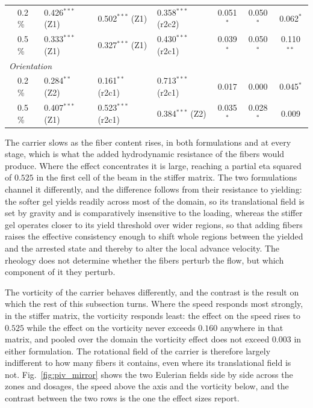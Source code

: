 \documentclass[%
  aip,
  pof,          %
  reprint,      %
  floatfix
]{revtex4-2}
\begin{document}
\begin{table}[htb]
\begin{tabular}{l l l l l c c c}
  & 0.2\,\% & 0.426$^{***}$ (Z1)  & 0.502$^{***}$ (Z1)  & 0.358$^{***}$ (r2c2) & 0.051$^{*}$ & 0.050$^{*}$ & 0.062$^{*}$ \\
  & 0.5\,\% & 0.333$^{***}$ (Z1)  & 0.327$^{***}$ (Z1)  & 0.430$^{***}$ (r2c1) & 0.039$^{*}$ & 0.050$^{*}$ & 0.110$^{**}$ \\
\midrule
\multicolumn{8}{l}{\textit{Orientation}} \\
\addlinespace[1pt]
\multirow{2}{*}{$\eta_{1}$ \; fiber}
  & 0.2\,\% & 0.284$^{**}$ (Z2)   & 0.161$^{**}$ (r2c1) & 0.713$^{***}$ (r2c1) & 0.017 & 0.000 & 0.045$^{*}$ \\
  & 0.5\,\% & 0.407$^{***}$ (Z1)  & 0.523$^{***}$ (r2c1) & 0.384$^{***}$ (Z2)  & 0.035$^{*}$ & 0.028$^{*}$ & 0.009 \\
\bottomrule
\end{tabular}
\end{table}

The carrier slows as the fiber content rises, in both formulations and at every stage, which is what the added hydrodynamic resistance of the fibers would produce. Where the effect concentrates it is large, reaching a partial eta squared of $0.525$ in the first cell of the beam in the stiffer matrix. The two formulations channel it differently, and the difference follows from their resistance to yielding: the softer gel yields readily across most of the domain, so its translational field is set by gravity and is comparatively insensitive to the loading, whereas the stiffer gel operates closer to its yield threshold over wider regions, so that adding fibers raises the effective consistency enough to shift whole regions between the yielded and the arrested state and thereby to alter the local advance velocity. The rheology does not determine whether the fibers perturb the flow, but which component of it they perturb.

The vorticity of the carrier behaves differently, and the contrast is the result on which the rest of this subsection turns. Where the speed responds most strongly, in the stiffer matrix, the vorticity responds least: the effect on the speed rises to $0.525$ while the effect on the vorticity never exceeds $0.160$ anywhere in that matrix, and pooled over the domain the vorticity effect does not exceed $0.003$ in either formulation. The rotational field of the carrier is therefore largely indifferent to how many fibers it contains, even where its translational field is not. Fig.~\ref{fig:piv_mirror} shows the two Eulerian fields side by side across the zones and dosages, the speed above the axis and the vorticity below, and the contrast between the two rows is the one the effect sizes report.
\end{document}
